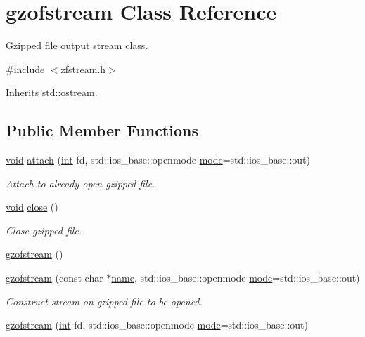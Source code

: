 \hypertarget{classgzofstream}{}\section{gzofstream Class Reference}
\label{classgzofstream}


Gzipped file output stream class.  




{\ttfamily \#include $<$zfstream.\+h$>$}



Inherits std\+::ostream.

\subsection*{Public Member Functions}
\begin{DoxyCompactItemize}
\item 
\hyperlink{lp__lib_8h_ac7828c7b2b31d2e11af17bdb6289c5d9}{void} \hyperlink{classgzofstream_a95b76eaecd03b6cbf53d2f4b1c867439}{attach} (\hyperlink{lp__lib_8h_adeb9ec6400320e4923ac9d836d509ddb}{int} fd, std\+::ios\+\_\+base\+::openmode \hyperlink{ioapi_8h_ab77191763734fbb3e515371393ccb606}{mode}=std\+::ios\+\_\+base\+::out)
\begin{DoxyCompactList}\small\item\em Attach to already open gzipped file. \end{DoxyCompactList}\item 
\hyperlink{lp__lib_8h_ac7828c7b2b31d2e11af17bdb6289c5d9}{void} \hyperlink{classgzofstream_a59e8b01e1c9741085f18ca456c4b8f54}{close} ()
\begin{DoxyCompactList}\small\item\em Close gzipped file. \end{DoxyCompactList}\item 
\hyperlink{classgzofstream_ae92ce0e4696e29741ee979f08cf5f7d2}{gzofstream} ()
\item 
\hyperlink{classgzofstream_a4334d31aab99f8c9c2277b672a55c78f}{gzofstream} (const char $\ast$\hyperlink{lp__lib_8h_a2946c588fc7fa2fa5b43ac54b7872725}{name}, std\+::ios\+\_\+base\+::openmode \hyperlink{ioapi_8h_ab77191763734fbb3e515371393ccb606}{mode}=std\+::ios\+\_\+base\+::out)
\begin{DoxyCompactList}\small\item\em Construct stream on gzipped file to be opened. \end{DoxyCompactList}\item 
\hyperlink{classgzofstream_aa94d0c8414119a52f2a7f42aa0440941}{gzofstream} (\hyperlink{lp__lib_8h_adeb9ec6400320e4923ac9d836d509ddb}{int} fd, std\+::ios\+\_\+base\+::openmode \hyperlink{ioapi_8h_ab77191763734fbb3e515371393ccb606}{mode}=std\+::ios\+\_\+base\+::out)

\end{DoxyCompactItemize}
